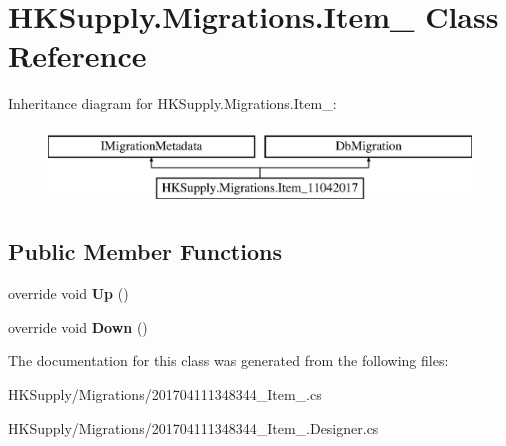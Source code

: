 \hypertarget{class_h_k_supply_1_1_migrations_1_1_item__11042017}{}\section{H\+K\+Supply.\+Migrations.\+Item\+\_ Class Reference}
\label{class_h_k_supply_1_1_migrations_1_1_item__11042017}
Inheritance diagram for H\+K\+Supply.\+Migrations.\+Item\+\_\+:\begin{figure}[H]
\begin{center}
\leavevmode
\includegraphics[height=2.000000cm]{class_h_k_supply_1_1_migrations_1_1_item__11042017}
\end{center}
\end{figure}
\subsection*{Public Member Functions}
\begin{DoxyCompactItemize}
\item 
\mbox{\label{class_h_k_supply_1_1_migrations_1_1_item__11042017_ac4d925ff82ab05f5bbac17476414647a}} 
override void {\bfseries Up} ()
\item 
\mbox{\label{class_h_k_supply_1_1_migrations_1_1_item__11042017_acb3f47085b6842a73a9484f7f00b8948}} 
override void {\bfseries Down} ()
\end{DoxyCompactItemize}


The documentation for this class was generated from the following files\+:\begin{DoxyCompactItemize}
\item 
H\+K\+Supply/\+Migrations/201704111348344\+\_\+\+Item\+\_.\+cs\item 
H\+K\+Supply/\+Migrations/201704111348344\+\_\+\+Item\+\_.\+Designer.\+cs\end{DoxyCompactItemize}

